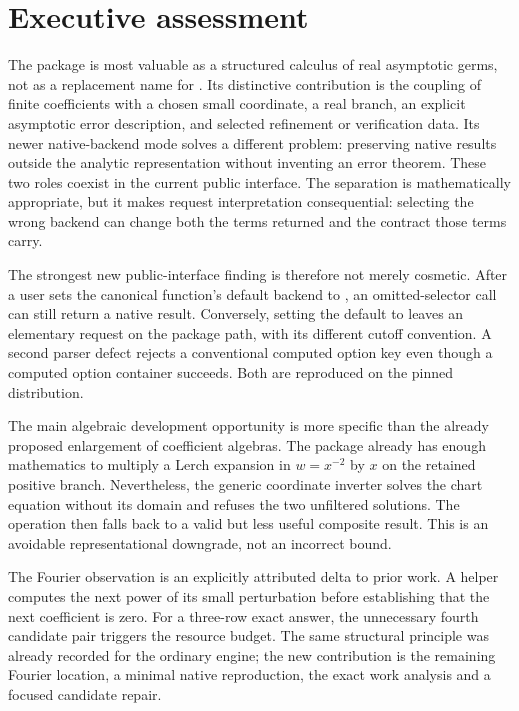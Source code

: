\documentclass[11pt,a4paper]{article}
\newcommand{\code}[1]{\texttt{\detokenize{#1}}}
\begin{document}
\section{Executive assessment}
\label{sec:executive}
The package is most valuable as a structured calculus of real asymptotic germs, not as a replacement name for \code{Series}. Its distinctive contribution is the coupling of finite coefficients with a chosen small coordinate, a real branch, an explicit asymptotic error description, and selected refinement or verification data. Its newer native-backend mode solves a different problem: preserving native results outside the analytic representation without inventing an error theorem. These two roles coexist in the current public interface. The separation is mathematically appropriate, but it makes request interpretation consequential: selecting the wrong backend can change both the terms returned and the contract those terms carry.\cite{repo-readme,native-plan,native-source}

The strongest new public-interface finding is therefore not merely cosmetic. After a user sets the canonical function's default backend to \code{"Package"}, an omitted-selector call can still return a native result. Conversely, setting the default to \code{"Series"} leaves an elementary request on the package path, with its different cutoff convention. A second parser defect rejects a conventional computed option key even though a computed option container succeeds. Both are reproduced on the pinned distribution.

The main algebraic development opportunity is more specific than the already proposed enlargement of coefficient algebras. The package already has enough mathematics to multiply a Lerch expansion in $w=x^{-2}$ by $x$ on the retained positive branch. Nevertheless, the generic coordinate inverter solves the chart equation without its domain and refuses the two unfiltered solutions. The operation then falls back to a valid but less useful composite result. This is an avoidable representational downgrade, not an incorrect bound.

The Fourier observation is an explicitly attributed delta to prior work. A helper computes the next power of its small perturbation before establishing that the next coefficient is zero. For a three-row exact answer, the unnecessary fourth candidate pair triggers the resource budget. The same structural principle was already recorded for the ordinary engine; the new contribution is the remaining Fourier location, a minimal native reproduction, the exact work analysis and a focused candidate repair.
\end{document}
